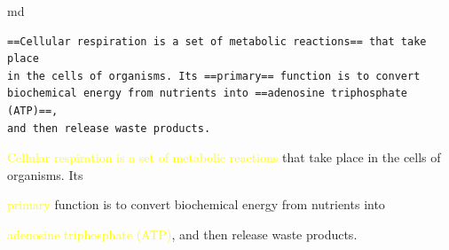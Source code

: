 \documentclass[a4paper,twoside]{article}
\begin{document}
\begin{code}{md}{}{}
\begin{Verbatim}[commandchars=\\\{\},breaklines, breakanywhere, commandchars=\\\{\}]
==Cellular respiration is a set of metabolic reactions== that take place
in the cells of organisms. Its ==primary== function is to convert
biochemical energy from nutrients into ==adenosine triphosphate (ATP)==,
and then release waste products.
\end{Verbatim}
\end{code}
\begin{displayquote}

\ifXeTeX
  \providecommand{\texsmithHighlight}[1]{\textcolor{yellow}{#1}}
  \providecommand{\hl}[1]{\textcolor{yellow}{#1}}
\else
  \ifLuaTeX
    \RequirePackage{lua-ul}
    \providecommand{\texsmithHighlight}[1]{%
      \begingroup
      \setulcolor{yellow}%
      \ul{#1}%
      \endgroup
    }
    \providecommand{\hl}[1]{\texsmithHighlight{#1}}
  \else
    \providecommand{\texsmithHighlight}[1]{%
      \begingroup
      \setlength{\fboxsep}{0.8pt}%
      \colorbox{yellow}{#1}%
      \endgroup
    }
  \fi
\fi

\texsmithHighlight{Cellular respiration is a set of metabolic reactions} that take place in the
cells of organisms. Its \ifXeTeX
  \providecommand{\texsmithHighlight}[1]{\textcolor{yellow}{#1}}
  \providecommand{\hl}[1]{\textcolor{yellow}{#1}}
\else
  \ifLuaTeX
    \RequirePackage{lua-ul}
    \providecommand{\texsmithHighlight}[1]{%
      \begingroup
      \setulcolor{yellow}%
      \ul{#1}%
      \endgroup
    }
    \providecommand{\hl}[1]{\texsmithHighlight{#1}}
  \else
    \providecommand{\texsmithHighlight}[1]{%
      \begingroup
      \setlength{\fboxsep}{0.8pt}%
      \colorbox{yellow}{#1}%
      \endgroup
    }
  \fi
\fi

\texsmithHighlight{primary} function is to convert biochemical energy
from nutrients into \ifXeTeX
  \providecommand{\texsmithHighlight}[1]{\textcolor{yellow}{#1}}
  \providecommand{\hl}[1]{\textcolor{yellow}{#1}}
\else
  \ifLuaTeX
    \RequirePackage{lua-ul}
    \providecommand{\texsmithHighlight}[1]{%
      \begingroup
      \setulcolor{yellow}%
      \ul{#1}%
      \endgroup
    }
    \providecommand{\hl}[1]{\texsmithHighlight{#1}}
  \else
    \providecommand{\texsmithHighlight}[1]{%
      \begingroup
      \setlength{\fboxsep}{0.8pt}%
      \colorbox{yellow}{#1}%
      \endgroup
    }
  \fi
\fi

\texsmithHighlight{adenosine triphosphate (ATP)}, and then release waste
products.

\end{displayquote}
\end{document}
